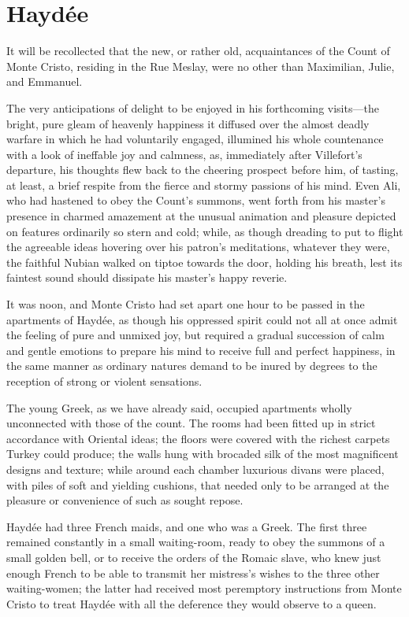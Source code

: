 \chapter{Haydée}

It will be recollected that the new, or rather old, acquaintances of
the Count of Monte Cristo, residing in the Rue Meslay, were no other
than Maximilian, Julie, and Emmanuel.

The very anticipations of delight to be enjoyed in his forthcoming
visits—the bright, pure gleam of heavenly happiness it diffused over
the almost deadly warfare in which he had voluntarily engaged,
illumined his whole countenance with a look of ineffable joy and
calmness, as, immediately after Villefort’s departure, his thoughts
flew back to the cheering prospect before him, of tasting, at least, a
brief respite from the fierce and stormy passions of his mind. Even
Ali, who had hastened to obey the Count’s summons, went forth from his
master’s presence in charmed amazement at the unusual animation and
pleasure depicted on features ordinarily so stern and cold; while, as
though dreading to put to flight the agreeable ideas hovering over his
patron’s meditations, whatever they were, the faithful Nubian walked on
tiptoe towards the door, holding his breath, lest its faintest sound
should dissipate his master’s happy reverie.

It was noon, and Monte Cristo had set apart one hour to be passed in
the apartments of Haydée, as though his oppressed spirit could not all
at once admit the feeling of pure and unmixed joy, but required a
gradual succession of calm and gentle emotions to prepare his mind to
receive full and perfect happiness, in the same manner as ordinary
natures demand to be inured by degrees to the reception of strong or
violent sensations.

The young Greek, as we have already said, occupied apartments wholly
unconnected with those of the count. The rooms had been fitted up in
strict accordance with Oriental ideas; the floors were covered with the
richest carpets Turkey could produce; the walls hung with brocaded silk
of the most magnificent designs and texture; while around each chamber
luxurious divans were placed, with piles of soft and yielding cushions,
that needed only to be arranged at the pleasure or convenience of such
as sought repose.

Haydée had three French maids, and one who was a Greek. The first three
remained constantly in a small waiting-room, ready to obey the summons
of a small golden bell, or to receive the orders of the Romaic slave,
who knew just enough French to be able to transmit her mistress’s
wishes to the three other waiting-women; the latter had received most
peremptory instructions from Monte Cristo to treat Haydée with all the
deference they would observe to a queen.

